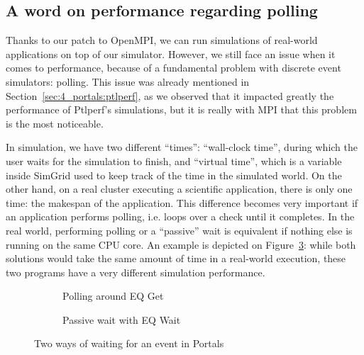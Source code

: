 \subsection{A word on performance regarding polling}
\label{subsec:5_high_level:polling}

Thanks to our patch to OpenMPI, we can run simulations of real-world
applications on top of our simulator. However, we still face an issue when it
comes to performance, because of a fundamental problem with discrete event
simulators: polling. This issue was already mentioned in
Section~\ref{sec:4_portals:ptlperf}, as we observed that it impacted greatly the
performance of Ptlperf's simulations, but it is really with MPI that this
problem is the most noticeable.

In simulation, we have two different ``times'': ``wall-clock time'', during
which the user waits for the simulation to finish, and ``virtual time'', which
is a variable inside SimGrid used to keep track of the time in the simulated
world. On the other hand, on a real cluster executing a scientific application,
there is only one time: the makespan of the application. This difference becomes
very important if an application performs polling, i.e. loops over a check until
it completes. In the real world, performing polling or a ``passive'' wait is
equivalent if nothing else is running on the same CPU core. An example is
depicted on Figure~\ref{fig:5_high_level:wait_example}: while both solutions
would take the same amount of time in a real-world execution, these two programs
have a very different simulation performance.

\begin{figure}
    \centering
    \begin{subfigure}{.5\textwidth}
        \centering
        
        \caption{Polling around EQ Get}
        \label{fig:5_high_level:active_polling_example}
    \end{subfigure}%
    \begin{subfigure}{.5\textwidth}
        \centering
        
        \caption{Passive wait with EQ Wait}
        \label{fig:5_high_level:passive_wait_example}
    \end{subfigure}
    \caption{Two ways of waiting for an event in Portals}
    \label{fig:5_high_level:wait_example}
\end{figure}

